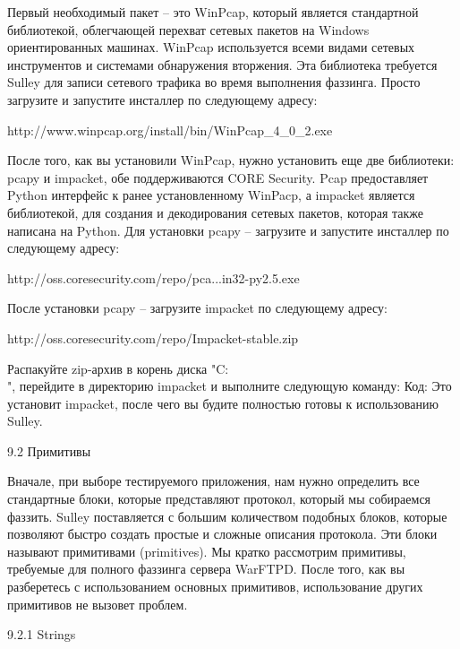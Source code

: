 \documentclass[12pt]{book}
\begin{document}
Первый необходимый пакет – это WinPcap, который является стандартной библиотекой, облегчающей перехват сетевых пакетов на Windows ориентированных машинах. WinPcap используется всеми видами сетевых инструментов и системами обнаружения вторжения. Эта библиотека требуется Sulley для записи сетевого трафика во время выполнения фаззинга. Просто загрузите и запустите инсталлер по следующему адресу:

http://www.winpcap.org/install/bin/WinPcap\_4\_0\_2.exe

После того, как вы установили WinPcap, нужно установить еще две библиотеки: pcapy и impacket, обе поддерживаются CORE Security. Pcap предоставляет Python интерфейс к ранее установленному WinPacp, а impacket является библиотекой, для создания и декодирования сетевых пакетов, которая также написана на Python. Для установки pcapy – загрузите и запустите инсталлер по следующему адресу:

http://oss.coresecurity.com/repo/pca...in32-py2.5.exe

После установки pcapy – загрузите impacket по следующему адресу:

http://oss.coresecurity.com/repo/Impacket-stable.zip

Распакуйте zip-архив в корень диска "C:\\", перейдите в директорию impacket и выполните следующую команду:
Код:
Это установит impacket, после чего вы будите полностью готовы к использованию Sulley.


9.2 Примитивы

Вначале, при выборе тестируемого приложения, нам нужно определить все стандартные блоки, которые представляют протокол, который мы собираемся фаззить. Sulley поставляется с большим количеством подобных блоков, которые позволяют быстро создать простые и сложные описания протокола. Эти блоки называют примитивами (primitives). Мы кратко рассмотрим примитивы, требуемые для полного фаззинга сервера WarFTPD. После того, как вы разберетесь с использованием основных примитивов, использование других примитивов не вызовет проблем.

9.2.1 Strings
\end{document}
